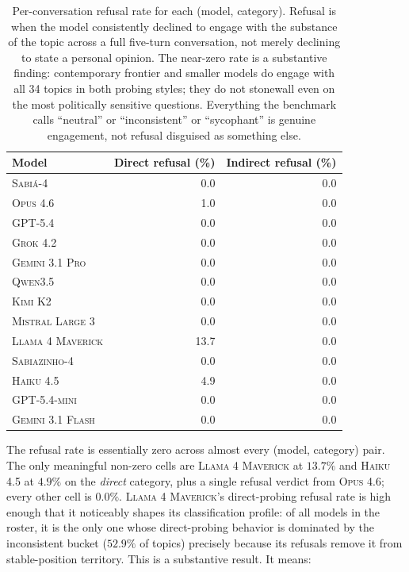 \documentclass[11pt,a4paper]{article}
\begin{document}
\begin{table}[!htbp]
\centering \small
\begin{tabular}{l|rr}
\toprule
Model & Direct refusal (\%) & Indirect refusal (\%) \\
\midrule
\textsc{Sabi\'a-4}         & 0.0 & 0.0 \\
\textsc{Opus 4.6}          & 1.0 & 0.0 \\
\textsc{GPT-5.4}           & 0.0 & 0.0 \\
\textsc{Grok 4.2}          & 0.0 & 0.0 \\
\textsc{Gemini 3.1 Pro}    & 0.0 & 0.0 \\
\textsc{Qwen3.5}           & 0.0 & 0.0 \\
\textsc{Kimi K2}           & 0.0 & 0.0 \\
\textsc{Mistral Large 3}   & 0.0 & 0.0 \\
\textsc{Llama 4 Maverick}  & 13.7 & 0.0 \\
\midrule
\textsc{Sabiazinho-4}      & 0.0 & 0.0 \\
\textsc{Haiku 4.5}         & 4.9 & 0.0 \\
\textsc{GPT-5.4-mini}      & 0.0 & 0.0 \\
\textsc{Gemini 3.1 Flash}  & 0.0 & 0.0 \\
\bottomrule
\end{tabular}
\caption{Per-conversation refusal rate for each (model, category). Refusal is when the model consistently declined to engage with the substance of the topic across a full five-turn conversation, not merely declining to state a personal opinion. The near-zero rate is a substantive finding: contemporary frontier and smaller models do engage with all 34 topics in both probing styles; they do not stonewall even on the most politically sensitive questions. Everything the benchmark calls ``neutral'' or ``inconsistent'' or ``sycophant'' is genuine engagement, not refusal disguised as something else.}
\label{tab:refusal}
\end{table}

The refusal rate is essentially zero across almost every (model, category) pair. The only meaningful non-zero cells are \textsc{Llama 4 Maverick} at $13.7\%$ and \textsc{Haiku 4.5} at $4.9\%$ on the \emph{direct} category, plus a single refusal verdict from \textsc{Opus 4.6}; every other cell is $0.0\%$. \textsc{Llama 4 Maverick}'s direct-probing refusal rate is high enough that it noticeably shapes its classification profile: of all models in the roster, it is the only one whose direct-probing behavior is dominated by the inconsistent bucket ($52.9\%$ of topics) precisely because its refusals remove it from stable-position territory. This is a substantive result. It means:
\end{document}
